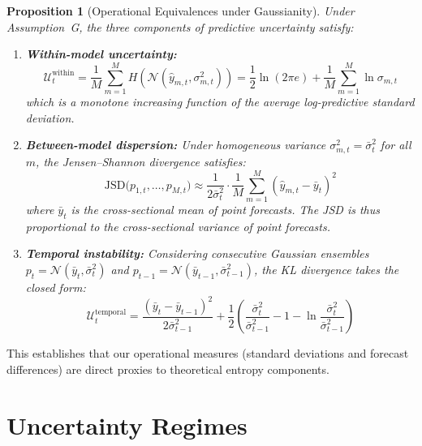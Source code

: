 \documentclass[12pt,a4paper]{article}
\newtheorem{proposition}{Proposition}
\theoremstyle{remark}
\begin{document}
\begin{proposition}[Operational Equivalences under Gaussianity]
\label{prop:operational}
Under Assumption~G, the three components of predictive uncertainty satisfy:
\begin{enumerate}[label=(\roman*)]
    \item \textbf{Within-model uncertainty:}
    \begin{equation}
        \mathcal{U}^{\text{within}}_t = \frac{1}{M}\sum_{m=1}^{M} H(\mathcal{N}(\hat{y}_{m,t}, \sigma_{m,t}^2)) = \frac{1}{2}\ln(2\pi e) + \frac{1}{M}\sum_{m=1}^{M} \ln \sigma_{m,t}
    \end{equation}
    which is a monotone increasing function of the average log-predictive standard deviation.
    \item \textbf{Between-model dispersion:} Under homogeneous variance $\sigma_{m,t}^2 = \bar{\sigma}_t^2$ for all $m$, the Jensen--Shannon divergence satisfies:
    \begin{equation}
        \mathrm{JSD}\big(p_{1,t},\dots,p_{M,t}\big) \approx \frac{1}{2\bar{\sigma}_t^2} \cdot \frac{1}{M}\sum_{m=1}^{M}(\hat{y}_{m,t} - \bar{y}_t)^2
    \end{equation}
    where $\bar{y}_t$ is the cross-sectional mean of point forecasts. The JSD is thus proportional to the cross-sectional variance of point forecasts.
    \item \textbf{Temporal instability:} Considering consecutive Gaussian ensembles $p_t = \mathcal{N}(\bar{y}_t, \bar{\sigma}_t^2)$ and $p_{t-1} = \mathcal{N}(\bar{y}_{t-1}, \bar{\sigma}_{t-1}^2)$, the KL divergence takes the closed form:
    \begin{equation}
        \mathcal{U}^{\text{temporal}}_t = \frac{(\bar{y}_t - \bar{y}_{t-1})^2}{2\bar{\sigma}_{t-1}^2} + \frac{1}{2}\left(\frac{\bar{\sigma}_t^2}{\bar{\sigma}_{t-1}^2} - 1 - \ln\frac{\bar{\sigma}_t^2}{\bar{\sigma}_{t-1}^2}\right)
    \end{equation}
\end{enumerate}
\end{proposition}

This establishes that our operational measures (standard deviations and forecast differences) are direct proxies to theoretical entropy components.

\section{Uncertainty Regimes}
\label{sec:appendix_regimes}
\end{document}
